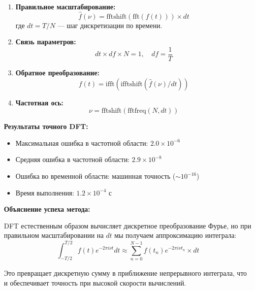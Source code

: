 \begin{enumerate}
    \item \textbf{Правильное масштабирование:}
    \begin{equation}
    \hat{f}(\nu) = \text{fftshift}(\text{fft}(f(t))) \times dt
    \end{equation}
    где $dt = T/N$ — шаг дискретизации по времени.

    \item \textbf{Связь параметров:}
    \begin{equation}
    dt \times df \times N = 1, \quad df = \frac{1}{T}
    \end{equation}

    \item \textbf{Обратное преобразование:}
    \begin{equation}
    f(t) = \text{ifft}(\text{ifftshift}(\hat{f}(\nu)/dt))
    \end{equation}

    \item \textbf{Частотная ось:}
    \begin{equation}
    \nu = \text{fftshift}(\text{fftfreq}(N, dt))
    \end{equation}
\end{enumerate}

\textbf{Результаты точного DFT:}
\begin{itemize}
    \item Максимальная ошибка в частотной области: $2.0 \times 10^{-6}$
    \item Средняя ошибка в частотной области: $2.9 \times 10^{-8}$
    \item Ошибка во временной области: машинная точность ($\sim 10^{-16}$)
    \item Время выполнения: $1.2 \times 10^{-4}$ с
\end{itemize}

\textbf{Объяснение успеха метода:}

DFT естественным образом вычисляет дискретное преобразование Фурье, но при правильном масштабировании на $dt$ мы получаем аппроксимацию интеграла:
\begin{equation}
\int_{-T/2}^{T/2} f(t) e^{-2\pi i \nu t} dt \approx \sum_{n=0}^{N-1} f(t_n) e^{-2\pi i \nu t_n} \times dt
\end{equation}

Это превращает дискретную сумму в приближение непрерывного интеграла, что и обеспечивает точность при высокой скорости вычислений.

